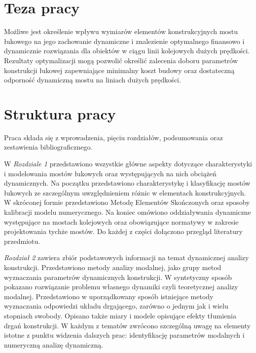 \section*{Teza pracy}
Możliwe jest określenie wpływu wymiarów elementów konstrukcyjnych mostu łukowego na jego zachowanie dynamiczne i znalezienie optymalnego finansowo i dynamicznie rozwiązania dla obiektów w ciągu linii kolejowych dużych prędkości. Rezultaty optymalizacji mogą pozwolić określić zalecenia doboru parametrów konstrukcji łukowej zapewniające minimalny koszt budowy oraz dostateczną odporność dynamiczną mostu na liniach dużych prędkości.



\section*{Struktura pracy}
Praca składa się z wprowadzenia, pięciu rozdziałów, podsumowania oraz zestawienia bibliograficznego. 

W \textit{Rozdziale 1} przedstawiono wszystkie główne aspekty dotyczące charakterystyki i modelowania mostów łukowych oraz występujących na nich obciążeń dynamicznych. Na początku przedstawiono charakterystykę i klasyfikację mostów łukowych ze szczególnym uwzględnieniem różnic w elementach konstrukcyjnych. W skróconej formie przedstawiono Metodę Elementów Skończonych oraz sposoby kalibracji modelu numerycznego. Na koniec omówiono oddziaływania dynamiczne występujące na mostach kolejowych oraz obowiązujące normatywy w zakresie projektowania tychże mostów. Do każdej z części dołączono przegląd literatury przedmiotu.

\textit{Rozdział 2} zawiera zbiór podstawowych informacji na temat dynamicznej analizy konstrukcji. Przedstawiono metody analizy modalnej, jako grupy metod wyznaczania parametrów dynamicznych konstrukcji. W syntetyczny sposób pokazano rozwiązanie problemu własnego dynamiki czyli teoretycznej analizy modalnej. Przedstawiono w uporządkowany sposób istniejące metody wyznaczania odpowiedzi układu drgającego, zarówno o jednym jak i wielu stopniach swobody. Opisano także miary i modele opisujące efekty tłumienia drgań konstrukcji. W każdym z tematów zwrócono szczególną uwagę na elementy istotne z punktu widzenia dalszych prac: identyfikację parametrów modalnych i numeryczną analizę dynamiczną.

